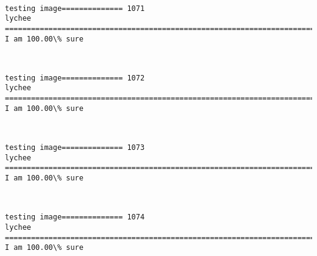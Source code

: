 \documentclass[11pt]{article}
\begin{document}
    \begin{center}
    \end{center}
    { \hspace*{\fill} \\}
    
    \begin{Verbatim}[commandchars=\\\{\}]
testing image============== 1071
lychee
============================================================================
I am 100.00\% sure

    \end{Verbatim}

    \begin{center}
    \end{center}
    { \hspace*{\fill} \\}
    
    \begin{Verbatim}[commandchars=\\\{\}]
testing image============== 1072
lychee
============================================================================
I am 100.00\% sure

    \end{Verbatim}

    \begin{center}
    \end{center}
    { \hspace*{\fill} \\}
    
    \begin{Verbatim}[commandchars=\\\{\}]
testing image============== 1073
lychee
============================================================================
I am 100.00\% sure

    \end{Verbatim}

    \begin{center}
    \end{center}
    { \hspace*{\fill} \\}
    
    \begin{Verbatim}[commandchars=\\\{\}]
testing image============== 1074
lychee
============================================================================
I am 100.00\% sure

    \end{Verbatim}
\end{document}
